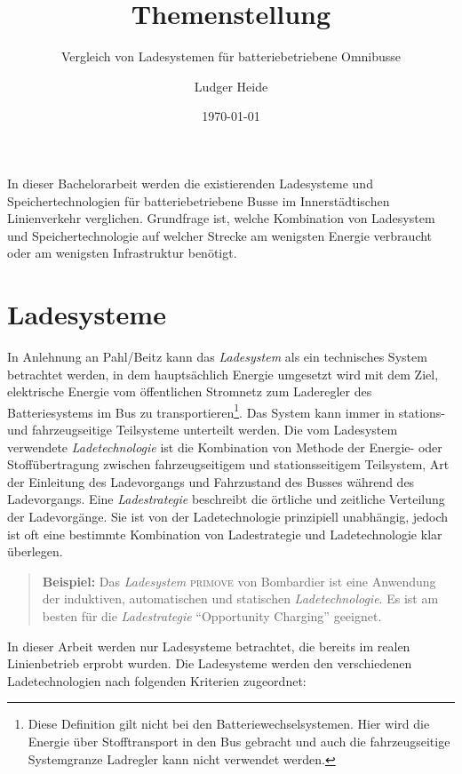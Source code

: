 \documentclass[twoside]{scrartcl}
\title{Themenstellung}
\subtitle{Vergleich von Ladesystemen für batteriebetriebene Omnibusse}
\date{\today}
\author{Ludger Heide}
\begin{document}

\maketitle



In dieser Bachelorarbeit werden die existierenden Ladesysteme und Speichertechnologien für batteriebetriebene Busse im Innerstädtischen Linienverkehr verglichen. Grundfrage ist, welche Kombination von Ladesystem und Speichertechnologie auf welcher Strecke am wenigsten Energie verbraucht oder am wenigsten Infrastruktur benötigt.

\section{Ladesysteme}

In Anlehnung an Pahl/Beitz \cite[S. 258]{feldhusen2013pahl} kann das \emph{Ladesystem} als ein technisches System betrachtet werden, in dem hauptsächlich Energie umgesetzt wird mit dem Ziel, elektrische Energie vom öffentlichen Stromnetz zum Laderegler des Batteriesystems im Bus zu transportieren\footnote{Diese Definition gilt nicht bei den Batteriewechselsystemen. Hier wird die Energie über Stofftransport in den Bus gebracht und auch die fahrzeugseitige Systemgranze Ladregler kann nicht verwendet werden.}. Das System kann immer in stations- und fahrzeugseitige Teilsysteme unterteilt werden. Die vom Ladesystem verwendete \emph{Ladetechnologie} ist die Kombination von Methode der Energie- oder Stoffübertragung zwischen fahrzeugseitigem und stationsseitigem Teilsystem, Art der Einleitung des Ladevorgangs und Fahrzustand des Busses während des Ladevorgangs. Eine \emph{Ladestrategie} beschreibt die örtliche und zeitliche Verteilung der Ladevorgänge. Sie ist von der Ladetechnologie prinzipiell unabhängig, jedoch ist oft eine bestimmte Kombination von Ladestrategie und Ladetechnologie klar überlegen.

\begin{quote}
	\textbf{Beispiel:} Das \emph{Ladesystem} \textsc{primove} von Bombardier ist eine Anwendung der induktiven, automatischen und statischen \emph{Ladetechnologie}. Es ist am besten für die \emph{Ladestrategie} "`Opportunity Charging"' geeignet.
\end{quote}

In dieser Arbeit werden nur Ladesysteme betrachtet, die bereits im realen Linienbetrieb erprobt wurden. Die Ladesysteme werden den verschiedenen Ladetechnologien nach folgenden Kriterien zugeordnet:
\end{document}
